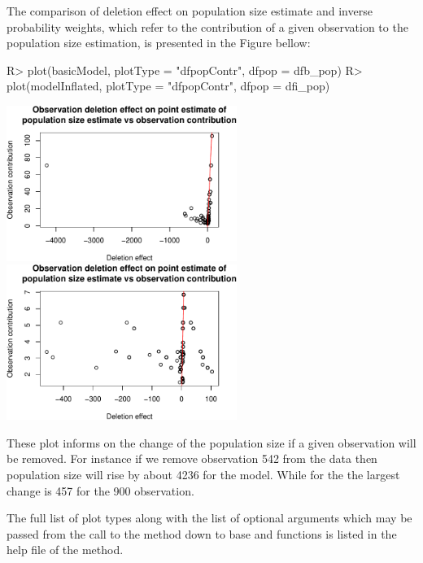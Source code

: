 \documentclass[
]{jss}
\newcommand{\1}{\mathcal{I}} \newcommand{\bZero}{\boldsymbol{0}}
\begin{document}
The comparison of deletion effect on population size estimate and
inverse probability weights, which refer to the contribution of a given
observation to the population size estimation, is presented in the
Figure bellow:

\begin{CodeChunk}
\begin{CodeInput}
R> plot(basicModel, plotType = "dfpopContr", dfpop = dfb_pop)
R> plot(modelInflated, plotType = "dfpopContr", dfpop = dfi_pop)
\end{CodeInput}


\begin{center}\includegraphics[width=7.5cm]{singleRcapture_files/figure-latex/dfpopsize_plot-1} \includegraphics[width=7.5cm]{singleRcapture_files/figure-latex/dfpopsize_plot-2} \end{center}

\end{CodeChunk}

These plot informs on the change of the population size if a given
observation will be removed. For instance if we remove observation 542
from the data then population size will rise by about 4236 for the
 model. While for the  the largest change
is 457 for the 900 observation.

The full list of plot types along with the list of optional arguments
which may be passed from the call to the  method down to base
 and  functions is listed in the help file of
the  method.
\end{document}
